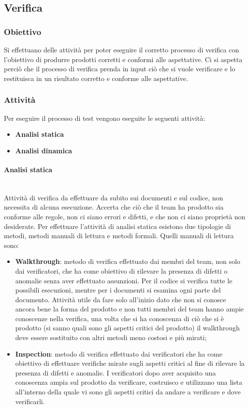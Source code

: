 
\subsection{Verifica}
\subsubsection{Obiettivo}
Si effettuano delle attività per poter eseguire il corretto processo di verifica con l’obiettivo di produrre prodotti corretti e conformi alle aspettative. Ci si aspetta perciò che il processo di verifica prenda in input ciò che si vuole verificare e lo restituisca in un risultato corretto e conforme alle aspettative.

\subsubsection{Attività}
Per eseguire il processo di test vengono eseguite le seguenti attività:
\begin{itemize} 
\item \textbf{Analisi statica}
\item \textbf{Analisi dinamica}
\end{itemize}

\paragraph{Analisi statica} \mbox{}\\
Attività di verifica da effettuare da subito sui documenti e sul codice, non necessita di alcuna esecuzione. Accerta che ciò che il team ha prodotto sia conforme alle regole, non ci siano errori e difetti, e che non ci siano proprietà non desiderate.  Per effettuare l’attività di analisi statica esistono due tipologie di metodi, metodi manuali di lettura e metodi formali. 
Quelli manuali di lettura sono:
\begin{itemize} 
\item \textbf{Walkthrough}: metodo di verifica effettuato dai membri del team, non solo dai verificatori, che ha come obiettivo di rilevare la presenza di difetti o anomalie senza aver effettuato assunzioni. Per il codice si verifica tutte le possibili esecuzioni, mentre per i documenti si esamina ogni parte del documento. Attività utile da fare solo all’inizio dato che non si conosce ancora bene la forma del prodotto e non tutti membri del team hanno ampie conoscenze nella verifica, una volta che si ha conoscenza di ciò che si è prodotto (si sanno quali sono gli aspetti critici del prodotto) il walkthrough deve essere sostituito con altri metodi meno costosi e più mirati;
\item \textbf{Inspection}: metodo di verifica effettuato dai verificatori che ha come obiettivo di effettuare verifiche mirate sugli aspetti critici al fine di rilevare la presenza di difetti e anomalie. I verificatori dopo aver acquisito una conoscenza ampia sul prodotto da verificare, costruisco e utilizzano una lista all’interno della quale vi sono gli aspetti critici da andare a verificare e dove verificarli.
\end{itemize}
